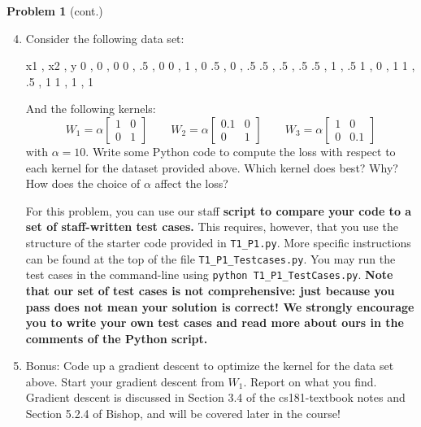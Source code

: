 \documentclass[submit]{harvardml}
\begin{document}
\newpage

\begin{framed}
\noindent\textbf{Problem 1} (cont.)\\
\begin{enumerate}
\setcounter{enumi}{3}
\item Consider the following data set:
\begin{csv}
x1 , x2 , y 
  0 , 0 , 0
  0 , .5 , 0
  0 , 1 , 0 
  .5 , 0 , .5
  .5 , .5 , .5
  .5 , 1 , .5
  1 , 0 , 1
  1 , .5 , 1
  1 , 1 , 1 
\end{csv}
And the following kernels:
\begin{equation*} 
W_1 = \alpha \begin{bmatrix}
  1 & 0 \\
  0 & 1 
\end{bmatrix}
\qquad
W_2 = \alpha \begin{bmatrix}
  0.1 & 0 \\
  0 & 1 
\end{bmatrix}
\qquad
W_3 = \alpha \begin{bmatrix}
  1 & 0 \\
  0 & 0.1 
\end{bmatrix}
\end{equation*} 
with $\alpha = 10$. Write some Python code to compute the loss with
respect to each kernel for the dataset provided above. Which kernel
does best?  Why?  How does the choice of $\alpha$ affect the loss? 

For this problem, you can use our staff \textbf{script to compare your code to a set of staff-written test cases.} This requires, however, that you use the structure of the starter code provided in \texttt{T1\_P1.py}. More specific instructions can be found at the top of the file \texttt{T1\_P1\_Testcases.py}. You may run the test cases in the command-line using \texttt{python T1\_P1\_TestCases.py}.
\textbf{Note that our set of test cases is not comprehensive: just because you pass does not mean your solution is correct! We strongly encourage you to write your own test cases and read more about ours in the comments of the Python script.}

\item Bonus:  Code up a gradient descent to
  optimize the kernel for the data set above.  Start your gradient
  descent from $W_1$.  Report on what you find.\\
  Gradient descent is discussed in Section 3.4 of the cs181-textbook notes and Section 5.2.4 of Bishop, and will be covered later in the course! 

\end{enumerate}
  
\end{framed}  
\end{document}

